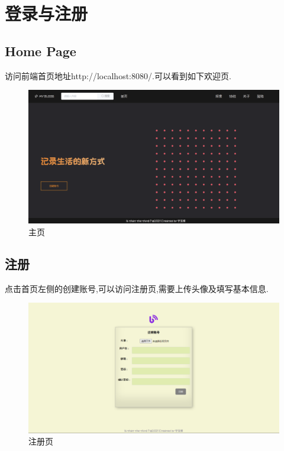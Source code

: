 \section{登录与注册}

\subsection{Home Page}
访问前端首页地址http://localhost:8080/.可以看到如下欢迎页.

\begin{figure}[thbp!]
	\centering
	\includegraphics[scale=0.35]{figure/home_page}
	\caption{主页}
\end{figure}

\subsection{注册}
点击首页左侧的创建账号,可以访问注册页,需要上传头像及填写基本信息.

\begin{figure}[thbp!]
	\centering
	\includegraphics[scale=0.35]{figure/register}
	\caption{注册页}
\end{figure}

